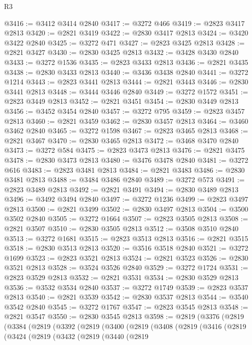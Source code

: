 \begin{lexlean}{R3}
\begin{coremodule}
@3416 := @3412 @3414 @2840
@3417 := @3272 @466
@3419 := @2823 @3417 @2813
@3420 := @2821 @3419
@3422 := @2830 @3417 @2813
@3424 := @3420 @3422 @2840
@3425 := @3272 @471
@3427 := @2823 @3425 @2813
@3428 := @2821 @3427
@3430 := @2830 @3425 @2813
@3432 := @3428 @3430 @2840
@3433 := @3272 @1536
@3435 := @2823 @3433 @2813
@3436 := @2821 @3435
@3438 := @2830 @3433 @2813
@3440 := @3436 @3438 @2840
@3441 := @3272 @1214
@3443 := @2823 @3441 @2813
@3444 := @2821 @3443
@3446 := @2830 @3441 @2813
@3448 := @3444 @3446 @2840
@3449 := @3272 @1572
@3451 := @2823 @3449 @2813
@3452 := @2821 @3451
@3454 := @2830 @3449 @2813
@3456 := @3452 @3454 @2840
@3457 := @3272 @795
@3459 := @2823 @3457 @2813
@3460 := @2821 @3459
@3462 := @2830 @3457 @2813
@3464 := @3460 @3462 @2840
@3465 := @3272 @1598
@3467 := @2823 @3465 @2813
@3468 := @2821 @3467
@3470 := @2830 @3465 @2813
@3472 := @3468 @3470 @2840
@3473 := @3272 @584
@3475 := @2823 @3473 @2813
@3476 := @2821 @3475
@3478 := @2830 @3473 @2813
@3480 := @3476 @3478 @2840
@3481 := @3272 @616
@3483 := @2823 @3481 @2813
@3484 := @2821 @3483
@3486 := @2830 @3481 @2813
@3488 := @3484 @3486 @2840
@3489 := @3272 @573
@3491 := @2823 @3489 @2813
@3492 := @2821 @3491
@3494 := @2830 @3489 @2813
@3496 := @3492 @3494 @2840
@3497 := @3272 @1236
@3499 := @2823 @3497 @2813
@3500 := @2821 @3499
@3502 := @2830 @3497 @2813
@3504 := @3500 @3502 @2840
@3505 := @3272 @1664
@3507 := @2823 @3505 @2813
@3508 := @2821 @3507
@3510 := @2830 @3505 @2813
@3512 := @3508 @3510 @2840
@3513 := @3272 @1681
@3515 := @2823 @3513 @2813
@3516 := @2821 @3515
@3518 := @2830 @3513 @2813
@3520 := @3516 @3518 @2840
@3521 := @3272 @1699
@3523 := @2823 @3521 @2813
@3524 := @2821 @3523
@3526 := @2830 @3521 @2813
@3528 := @3524 @3526 @2840
@3529 := @3272 @1724
@3531 := @2823 @3529 @2813
@3532 := @2821 @3531
@3534 := @2830 @3529 @2813
@3536 := @3532 @3534 @2840
@3537 := @3272 @1749
@3539 := @2823 @3537 @2813
@3540 := @2821 @3539
@3542 := @2830 @3537 @2813
@3544 := @3540 @3542 @2840
@3545 := @3272 @1767
@3547 := @2823 @3545 @2813
@3548 := @2821 @3547
@3550 := @2830 @3545 @2813
@3598 := @2819
    (@3376
      (@2819
        (@3384
          (@2819
            (@3392
              (@2819
                (@3400
                  (@2819
                    (@3408
                      (@2819
                        (@3416
                          (@2819
                            (@3424
                              (@2819
                                (@3432
                                  (@2819
                                    (@3440
                                      (@2819

\end{coremodule}
\end{lexlean}
